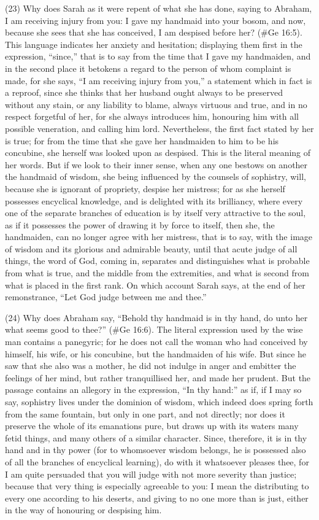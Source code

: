 (23) Why does Sarah as it were repent of what she has done, saying to Abraham, I am receiving
injury from you: I gave my handmaid into your bosom, and now, because she sees that she has
conceived, I am despised before her? (\#Ge 16:5). This language indicates her anxiety and
hesitation; displaying them first in the expression, ``since,'' that is to say from the time that I gave
my handmaiden, and in the second place it betokens a regard to the person of whom complaint is
made, for she says, ``I am receiving injury from you,'' a statement which in fact is a reproof, since
she thinks that her husband ought always to be preserved without any stain, or any liability to
blame, always virtuous and true, and in no respect forgetful of her, for she always introduces him,
honouring him with all possible veneration, and calling him lord. Nevertheless, the first fact stated
by her is true; for from the time that she gave her handmaiden to him to be his concubine, she
herself was looked upon as despised. This is the literal meaning of her words. But if we look to
their inner sense, when any one bestows on another the handmaid of wisdom, she being
influenced by the counsels of sophistry, will, because she is ignorant of propriety, despise her
mistress; for as she herself possesses encyclical knowledge, and is delighted with its brilliancy,
where every one of the separate branches of education is by itself very attractive to the soul, as if
it possesses the power of drawing it by force to itself, then she, the handmaiden, can no longer
agree with her mistress, that is to say, with the image of wisdom and its glorious and admirable
beauty, until that acute judge of all things, the word of God, coming in, separates and distinguishes
what is probable from what is true, and the middle from the extremities, and what is second from
what is placed in the first rank. On which account Sarah says, at the end of her remonstrance, ``Let
God judge between me and thee.''

(24) Why does Abraham say, ``Behold thy handmaid is in thy hand, do unto her what seems good to
thee?'' (\#Ge 16:6). The literal expression used by the wise man contains a panegyric; for he
does not call the woman who had conceived by himself, his wife, or his concubine, but the
handmaiden of his wife. But since he saw that she also was a mother, he did not indulge in anger
and embitter the feelings of her mind, but rather tranquillised her, and made her prudent. But the
passage contains an allegory in the expression, ``In thy hand:'' as if, if I may so say, sophistry lives
under the dominion of wisdom, which indeed does spring forth from the same fountain, but only in
one part, and not directly; nor does it preserve the whole of its emanations pure, but draws up with
its waters many fetid things, and many others of a similar character. Since, therefore, it is in thy
hand and in thy power (for to whomsoever wisdom belongs, he is possessed also of all the
branches of encyclical learning), do with it whatsoever pleases thee, for I am quite persuaded that
you will judge with not more severity than justice; because that very thing is especially agreeable to
you: I mean the distributing to every one according to his deserts, and giving to no one more than
is just, either in the way of honouring or despising him.

